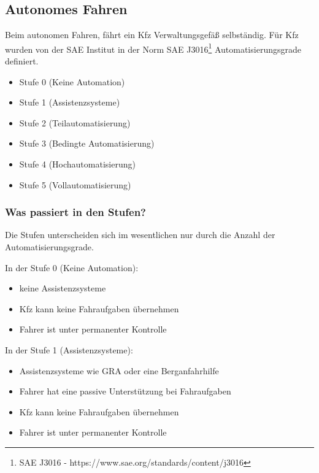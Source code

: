 \newpage

\subsection{Autonomes Fahren}

Beim autonomen Fahren, fährt ein \ac{Kfz} Verwaltungsgefäß selbständig.
Für \ac{Kfz} wurden von der \ac{SAE} Institut in der Norm SAE J3016\footnote{SAE J3016 - https://www.sae.org/standards/content/j3016} Automatisierungsgrade definiert.
\begin{itemize}
	\item Stufe 0 (Keine Automation)
	\item Stufe 1 (Assistenzsysteme)
	\item Stufe 2 (Teilautomatisierung)
	\item Stufe 3 (Bedingte Automatisierung)
	\item Stufe 4 (Hochautomatisierung)
	\item Stufe 5 (Vollautomatisierung)
\end{itemize}
\subsubsection{Was passiert in den Stufen?}
Die Stufen unterscheiden sich im wesentlichen nur durch die Anzahl der Automatisierungsgrade.

\vspace{0.5cm}

In der Stufe 0 (Keine Automation):
\begin{itemize}
	\item keine Assistenzsysteme
	\item \ac{Kfz} kann keine Fahraufgaben übernehmen
	\item Fahrer ist unter permanenter Kontrolle
\end{itemize}

\vspace{0.5cm}

In der Stufe 1 (Assistenzsysteme):
\begin{itemize}
	\item Assistenzsysteme wie \ac{GRA} oder eine Berganfahrhilfe
	\item Fahrer hat eine passive Unterstützung bei Fahraufgaben
	\item \ac{Kfz} kann keine Fahraufgaben übernehmen
	\item Fahrer ist unter permanenter Kontrolle
\end{itemize}


